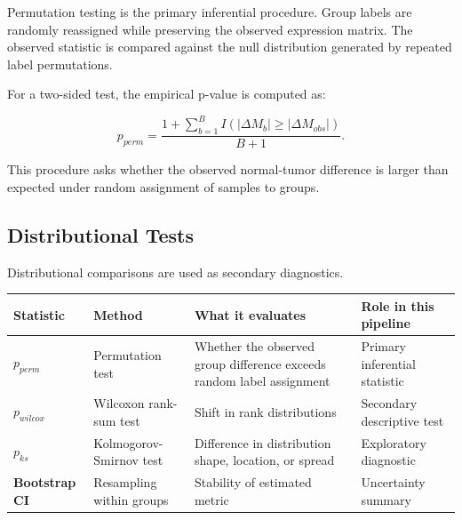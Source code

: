 \documentclass[
  letterpaper,
  DIV=11,
  numbers=noendperiod,
  openany,
  oneside]{scrreprt}
\begin{document}
Permutation testing is the primary inferential procedure. Group labels
are randomly reassigned while preserving the observed expression matrix.
The observed statistic is compared against the null distribution
generated by repeated label permutations.

For a two-sided test, the empirical p-value is computed as:

\[
p_{perm} = \frac{1 + \sum_{b=1}^{B} I(|\Delta M_b| \geq |\Delta M_{obs}|)}{B + 1}.
\]

This procedure asks whether the observed normal-tumor difference is
larger than expected under random assignment of samples to groups.

\subsection{Distributional Tests}\label{distributional-tests}

Distributional comparisons are used as secondary diagnostics.

\begin{longtable}[]{@{}
  >{\raggedright\arraybackslash}p{}
  >{\raggedright\arraybackslash}p{}
  >{\raggedright\arraybackslash}p{}
  >{\raggedright\arraybackslash}p{}@{}}
\toprule\noalign{}
\begin{minipage}[b]{\linewidth}\raggedright
Statistic
\end{minipage} & \begin{minipage}[b]{\linewidth}\raggedright
Method
\end{minipage} & \begin{minipage}[b]{\linewidth}\raggedright
What it evaluates
\end{minipage} & \begin{minipage}[b]{\linewidth}\raggedright
Role in this pipeline
\end{minipage} \\
\midrule\noalign{}
\endhead
\bottomrule\noalign{}
\endlastfoot
\textbf{\(p_{perm}\)} & Permutation test & Whether the observed group
difference exceeds random label assignment & Primary inferential
statistic \\
\textbf{\(p_{wilcox}\)} & Wilcoxon rank-sum test & Shift in rank
distributions & Secondary descriptive test \\
\textbf{\(p_{ks}\)} & Kolmogorov-Smirnov test & Difference in
distribution shape, location, or spread & Exploratory diagnostic \\
\textbf{Bootstrap CI} & Resampling within groups & Stability of
estimated metric & Uncertainty summary \\
\end{longtable}
\end{document}
